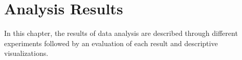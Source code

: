 \section{Analysis Results}
\label{sec:results}

In this chapter, the results of data analysis are described through different experiments followed by an evaluation of each result and descriptive visualizations.




